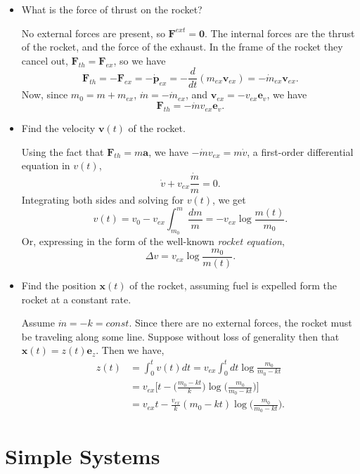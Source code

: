 \documentclass[
  letterpaper,
  DIV=11,
  numbers=noendperiod]{scrreprt}
\begin{document}
\begin{itemize}
\item
  What is the force of thrust on the rocket?

  No external forces are present, so \(\mathbf{F}^{ext} = \mathbf{0}\).
  The internal forces are the thrust of the rocket, and the force of the
  exhaust. In the frame of the rocket they cancel out,
  \(\mathbf{F}_{th} = \mathbf{F}_{ex}\), so we have \[
  \mathbf{F}_{th} = -\mathbf{F}_{ex} = -\mathbf{\dot p}_{ex} = -\frac{d}{dt}(m_{ex} \mathbf{v}_{ex}) = -\dot m_{ex} \mathbf{v}_{ex}.
  \] Now, since \(m_0 = m + m_{ex}\), \(\dot m = -\dot m_{ex}\), and
  \(\mathbf{v}_{ex} = -v_{ex}\mathbf{e}_v\), we have \[
  \mathbf{F}_{th} = -\dot m v_{ex} \mathbf{e}_v.
  \]
\item
  Find the velocity \(\mathbf{v}(t)\) of the rocket.

  Using the fact that \(\mathbf{F}_{th} = m\mathbf{a}\), we have
  \(-\dot m v_{ex} = m \dot v\), a first-order differential equation in
  \(v(t)\), \[
  \dot v + v_{ex} \frac{\dot m}{m} = 0.
  \] Integrating both sides and solving for \(v(t)\), we get \[
  v(t) = v_0 - v_{ex} \int_{m_0}^m \frac{dm}{m} = -v_{ex} \log \frac{m(t)}{m_0}.
  \] Or, expressing in the form of the well-known \emph{rocket
  equation}, \[
  \Delta v = v_{ex} \log\frac{m_0}{m(t)}.
  \]
\item
  Find the position \(\mathbf{x}(t)\) of the rocket, assuming fuel is
  expelled form the rocket at a constant rate.

  Assume \(\dot m = -k = const\). Since there are no external forces,
  the rocket must be traveling along some line. Suppose without loss of
  generality then that \(\mathbf{x}(t) = z(t)\mathbf{e}_z\). Then we
  have, \[
  \begin{align*}
  z(t) &= \int_0^t v(t) dt = v_{ex} \int_0^t dt \log\frac{m_0}{m_0-kt} \\
  &= v_{ex} \bigg[t - \bigg(\frac{m_0-kt}{k} \bigg) \log \bigg(\frac{m_0}{m_0-kt} \bigg) \bigg] \\
  &= v_{ex} t - \frac{v_{ex}}{k}(m_0 - kt)\log\bigg(\frac{m_0}{m_0-kt} \bigg).
  \end{align*}
  \]
\end{itemize}

\hypertarget{simple-systems}{%
\chapter{Simple Systems}\label{simple-systems}}
\end{document}
